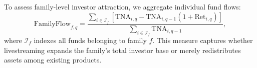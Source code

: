\documentclass[12pt]{article}
\begin{document}
To assess family-level investor attraction, we aggregate individual fund flows:
\begin{equation}
    \label{eq:family_flow}
    \text{FamilyFlow}_{f,q} = \frac{\sum_{i \in \mathcal{I}_f} \left[\text{TNA}_{i,q} - \text{TNA}_{i,q-1}(1 + \text{Ret}_{i,q})\right]}{\sum_{i \in \mathcal{I}_f} \text{TNA}_{i,q-1}},
\end{equation}
where $\mathcal{I}_f$ indexes all funds belonging to family $f$. This measure captures whether livestreaming expands the family's total investor base or merely redistributes assets among existing products.





\end{document}
